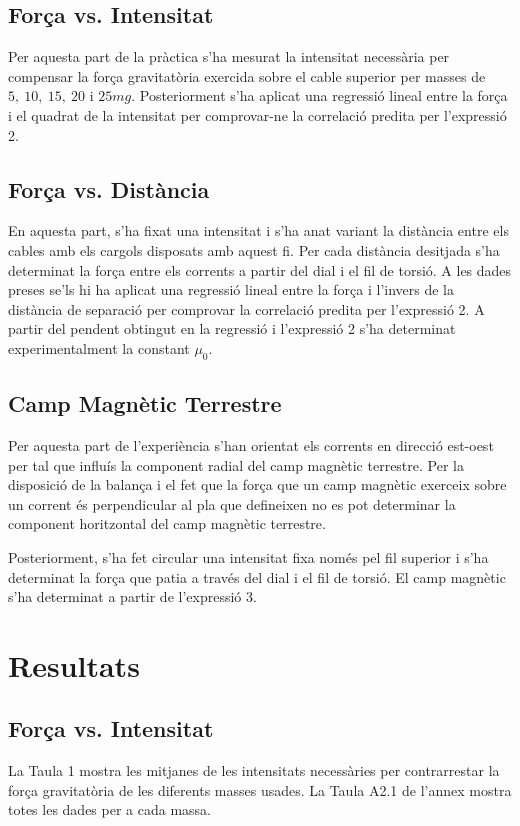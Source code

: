 \documentclass[a4paper,11pt]{article}
\begin{document}
\subsection{Força vs. Intensitat}

Per aquesta part de la pràctica s'ha mesurat la intensitat necessària per compensar la força gravitatòria exercida sobre el cable superior per masses de $5,\ 10,\ 15,\ 20$ i $25\si{mg}$. Posteriorment s'ha aplicat una regressió lineal entre la força i el quadrat de la intensitat per comprovar-ne la correlació predita per l'expressió 2.

\subsection{Força vs. Distància}
En aquesta part, s'ha fixat una intensitat i s'ha anat variant la distància entre els cables amb els cargols disposats amb aquest fi. Per cada distància desitjada s'ha determinat la força entre els corrents a partir del dial i el fil de torsió. A les dades preses se'ls hi ha aplicat una regressió lineal entre la força i l'invers de la distància de separació per comprovar la correlació predita per l'expressió 2. A partir del pendent obtingut en la regressió i l'expressió 2 s'ha determinat experimentalment la constant $\mu_0$.
\subsection{Camp Magnètic Terrestre}
Per aquesta part de l'experiència %
s'han orientat els corrents en direcció est-oest per tal que influís la component radial del camp magnètic terrestre. Per la disposició de la balança i el fet que la força que un camp magnètic exerceix sobre un corrent és perpendicular al pla que defineixen no es pot determinar la component horitzontal del camp magnètic terrestre.

Posteriorment, s'ha fet circular una intensitat fixa només pel fil superior i s'ha determinat la força que patia a través del dial i el fil de torsió. El camp magnètic s'ha determinat a partir de l'expressió 3.

\section{Resultats}
\subsection{Força vs. Intensitat}
La Taula 1 mostra les mitjanes de les intensitats necessàries per contrarrestar la força gravitatòria de les diferents masses usades. La Taula A2.1 %
de l'annex mostra totes les dades per a cada massa.
\end{document}
